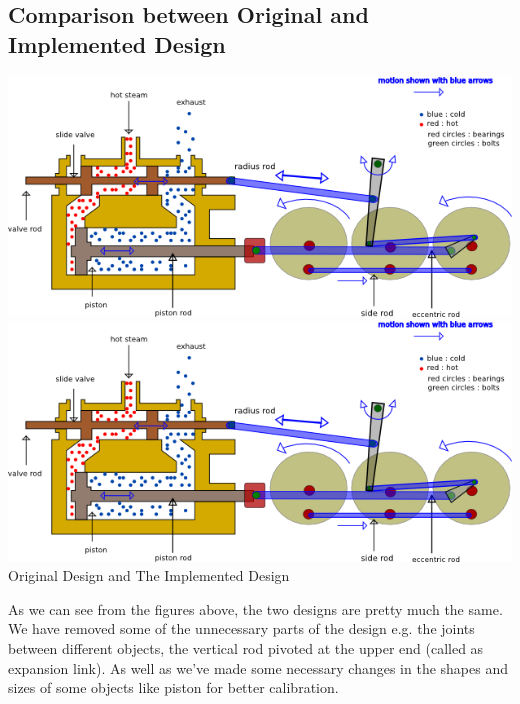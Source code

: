 \documentclass[11pt]{article}
\begin{document}
\subsection{Comparison between Original and Implemented Design}
\begin{center}
  \includegraphics[scale=.5]{loco.png}
  \includegraphics[scale=.5]{loco1.png}
  Original Design and The Implemented Design
\end{center}
As we can see from the figures above, the two designs are pretty much the same. We have removed some of the unnecessary parts of the design e.g. the joints between different objects, the vertical rod pivoted at the upper end (called as expansion link). As well as we've made some necessary changes in the shapes and sizes of some objects like piston for better calibration.
\end{document}
